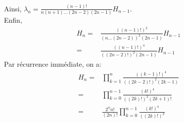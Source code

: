 \documentclass[8pt]{book}
\begin{document}
\begin{enumerate}[leftmargin=*]
		\\Ainsi, $\lambda_n=\displaystyle\frac{(n-1)!}{n(n+1)\dots(2n-2)(2n-1)}H_{n-1}$.
		\\Enfin, \begin{align*}
			H_n=&\displaystyle\frac{((n-1)!)^2}{(n\dots(2n-2))^2(2n-1)}H_{n-1}\\
			=&\displaystyle\frac{((n-1)!)^4}{((2n-2)!)^2(2n-1)}H_{n-1}
		\end{align*}
		Par récurrence immédiate, on a: \begin{align*}
			H_n=&\displaystyle\prod_{k=1}^{n}\frac{((k-1)!)^4}{((2k-2)!)^2(2k-1)}\\
			=&\prod_{k=0}^{n-1}\frac{(k!)^4}{((2k)!)^2(2k+1)!}\\
			=&\frac{2^nn!}{(2n)!}\prod_{k=0}^{n-1}\frac{(k!)^4}{((2k)!)^2}
		\end{align*}
		
	\end{enumerate}
\end{document}
